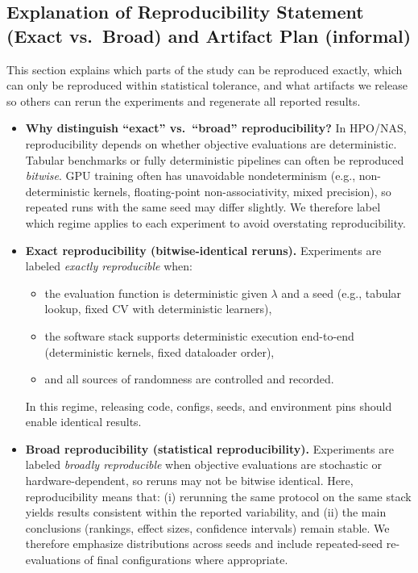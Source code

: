 \subsection*{Explanation of Reproducibility Statement (Exact vs.\ Broad) and Artifact Plan (informal)}
This section explains which parts of the study can be reproduced exactly, which can only be reproduced within statistical tolerance,
and what artifacts we release so others can rerun the experiments and regenerate all reported results.

\begin{itemize}
    \item \textbf{Why distinguish ``exact'' vs.\ ``broad'' reproducibility?}
    In HPO/NAS, reproducibility depends on whether objective evaluations are deterministic.
    Tabular benchmarks or fully deterministic pipelines can often be reproduced \emph{bitwise}.
    GPU training often has unavoidable nondeterminism (e.g., non-deterministic kernels, floating-point non-associativity, mixed precision),
    so repeated runs with the same seed may differ slightly.
    We therefore label which regime applies to each experiment to avoid overstating reproducibility.

    \item \textbf{Exact reproducibility (bitwise-identical reruns).}
    Experiments are labeled \emph{exactly reproducible} when:
    \begin{itemize}
        \item the evaluation function is deterministic given \(\lambda\) and a seed (e.g., tabular lookup, fixed CV with deterministic learners),
        \item the software stack supports deterministic execution end-to-end (deterministic kernels, fixed dataloader order),
        \item and all sources of randomness are controlled and recorded.
    \end{itemize}
    In this regime, releasing code, configs, seeds, and environment pins should enable identical results.

    \item \textbf{Broad reproducibility (statistical reproducibility).}
    Experiments are labeled \emph{broadly reproducible} when objective evaluations are stochastic or hardware-dependent,
    so reruns may not be bitwise identical.
    Here, reproducibility means that:
    (i) rerunning the same protocol on the same stack yields results consistent within the reported variability, and
    (ii) the main conclusions (rankings, effect sizes, confidence intervals) remain stable.
    We therefore emphasize distributions across seeds and include repeated-seed re-evaluations of final configurations where appropriate.


\end{itemize}
